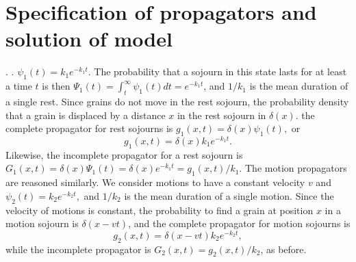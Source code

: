 \documentclass[draft,grl]{agujournal2018}
\newcommand\be{\begin{equation}}
\newcommand\ee{\end{equation}}
\begin{document}
\section{Specification of propagators and solution of model}
\label{sec:solution}
\citep[e.g.,][]{Yano1969,Einstein1937,Fathel2015, Martin2012}\citep[e.g.,][]{Furbish2016} \citep[e.g.,][]{Fan2016,Wu2019}.
 \citep[e.g.,][]{Weiss1994,Weeks1998}.
  $\psi_1(t) = k_1 e^{-k_1t}.$
The probability that a sojourn in this state lasts for at least a time $t$ is then $\Psi_1(t) = \int_t^\infty \psi_1(t)dt = e^{-k_1 t}$, and $1/k_1$ is the mean duration of a single rest.
Since grains do not move in the rest sojourn, the probability density that a grain is displaced by a distance $x$ in the rest sojourn in $\delta(x)$.
 the complete propagator for rest sojourns is $g_1(x,t) = \delta(x)\psi_1(t),$ or 
\be g_1(x,t) = \delta(x)k_1e^{-k_1t}.\label{eq:prop1} \ee
Likewise, the incomplete propagator for a rest sojourn is $G_1(x,t) = \delta(x)\Psi_1(t) = \delta(x)e^{-k_1t} = g_1(x,t)/k_1.$
The motion propagators are reasoned similarly. We consider motions to have a constant velocity $v$ and  $\psi_2(t) = k_2 e^{-k_2t},$
and $1/k_2$ is the mean duration of a single motion.
Since the velocity of motions is constant, the probability to find a grain at position $x$ in a motion sojourn is $\delta(x-vt)$, and the complete propagator for motion sojourns is 
\be g_2(x,t) = \delta(x-vt)k_2e^{-k_2t},\label{eq:prop2}\ee
while the incomplete propagator is $G_2(x,t) = g_2(x,t)/k_2$, as before.
\end{document}
